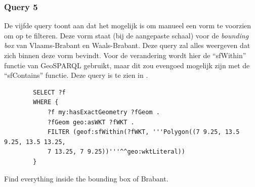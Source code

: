 \subsubsection{Query 5}
De vijfde query toont aan dat het mogelijk is om manueel een vorm te voorzien om op te filteren. Deze vorm staat (bij de aangepaste schaal) voor de \textit{bounding box} van Vlaams-Brabant en Waals-Brabant. Deze query zal alles weergeven dat zich binnen deze vorm bevindt. Voor de verandering wordt hier de ``sfWithin'' functie van GeoSPARQL gebruikt, maar dit zou evengoed mogelijk zijn met de ``sfContains'' functie. Deze query is te zien in .

\begin{listing}[ht]
    \begin{verbatim}
        SELECT ?f
        WHERE {
            ?f my:hasExactGeometry ?fGeom .
            ?fGeom geo:asWKT ?fWKT .
            FILTER (geof:sfWithin(?fWKT, '''Polygon((7 9.25, 13.5 9.25, 13.5 13.25, 
            7 13.25, 7 9.25))'''^^geo:wktLiteral))
        }
    \end{verbatim}
    \caption{Find everything inside the bounding box of Brabant.}
    \label{listing:find_everything_bounding_box}
\end{listing}




